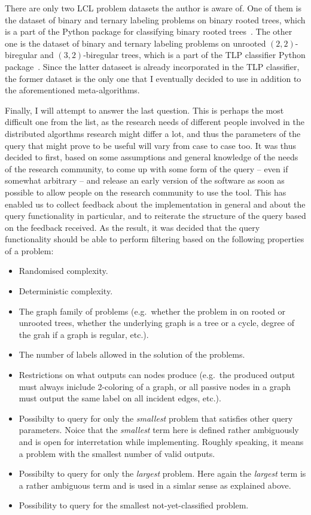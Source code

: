 There are only two LCL problem datasets the author is aware of. One of them is the dataset of binary and ternary labeling problems on binary rooted trees, which is a
part of the Python package for classifying binary rooted trees~\cite{Tereshchenko2020brt}. The other one is the dataset of binary and ternary labeling problems on
unrooted $(2, 2)$-biregular and $(3, 2)$-biregular trees, which is a part of the TLP classifier Python package~\cite{Rocher2020clas}. Since the latter dataseet is already incorporated in the TLP classifier,
the former dataset is the only one that I eventually decided to use
in addition to the aforementioned meta-algorithms.

Finally, I will attempt to answer the last question.
This is perhaps the most difficult one from the list,
as the research needs of different people involved in
the distributed algorthms research might differ a lot, and thus
the parameters of the query that might prove to be useful
will vary from case to case too. It was thus decided to first,
based on some assumptions and general knowledge of the
needs of the research community, to come up with some form of the
query -- even if somewhat arbitrary -- and release an early version
of the software as soon as possible to allow people on the
research community to use the tool. This has enabled us to
collect feedback about the implementation in general and about the
query functionality in particular, and to reiterate the structure of
the query based on the feedback received. As the result, it was
decided that the query functionality should be able to perform
filtering based on the following properties of a problem:

\begin{itemize}
  \item Randomised complexity.
  \item Deterministic complexity.
  \item The graph family of problems (e.g.\ whether the problem in on
  rooted or unrooted trees, whether the underlying graph is a tree
  or a cycle, degree of the grah if a graph is regular, etc.).
  \item The number of labels allowed in the solution of the problems.
  \item Restrictions on what outputs can nodes produce (e.g.\ the
  produced output must always iniclude 2-coloring of a graph,
  or all passive nodes in a graph must output the same
  label on all incident edges, etc.).
  \item Possibilty to query for only the \emph{smallest} problem that
  satisfies other query parameters. Noice that the \emph{smallest} term here is
  defined rather ambiguously and is open for interretation while implementing. Roughly speaking, it means a problem with the smallest
  number of valid outputs.
  \item Possibilty to query for only the \emph{largest} problem. Here again
  the \emph{largest} term is a rather ambiguous term and is used in a simlar sense
  as explained above.
  \item Possibility to query for the smallest not-yet-classified problem.
\end{itemize}
